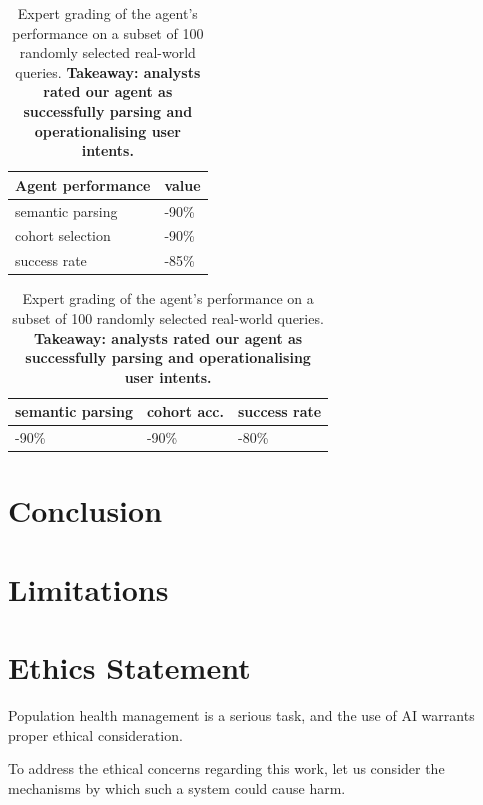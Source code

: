 \documentclass[11pt]{article}
\begin{document}
\begin{table}[ht]
\centering
\begin{tabular}{|l|l|}
\hline
	Agent performance & value \\
\hline

	semantic parsing & -90\% 	\\
	cohort selection & -90\%	\\
	success rate	 & -85\%	\\
\hline
\end{tabular}
\caption{
	Expert grading of the agent's performance on a subset of 100 randomly selected real-world queries.
	\textbf{Takeaway: analysts rated our agent as successfully parsing and operationalising user intents.}	
}
\label{tab:user-feedback}
\end{table}



\begin{table}[ht]
\centering
\begin{tabular}{|l|l|l|}
\hline
	semantic parsing  & cohort acc. & success rate	\\	
\hline
	-90\%		  & -90\%		& -80\%	\\
\hline	
\end{tabular}
\caption{
	Expert grading of the agent's performance on a subset of 100 randomly selected real-world queries.
	\textbf{Takeaway: analysts rated our agent as successfully parsing and operationalising user intents.}	
}
\label{tab:expert-feedback}
\end{table}


\section{Conclusion}


\section{Limitations}

\section{Ethics Statement}
Population health management is a serious task, and the use of AI warrants proper ethical consideration.

To address the ethical concerns regarding this work, let us consider the mechanisms by which such a system could cause harm.
\end{document}
